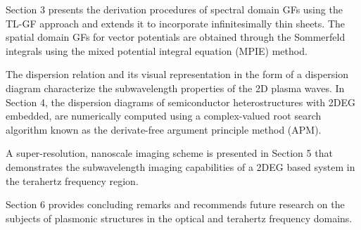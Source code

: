 Section 3 presents the derivation procedures of spectral domain GFs using the TL-GF approach \cite{Michalski1997,Michalski2005} and extends it to incorporate infinitesimally thin sheets. The spatial domain GFs for vector potentials are obtained through the Sommerfeld integrals using the mixed potential integral equation (MPIE) method.

The dispersion relation and its visual representation in the form of a dispersion diagram characterize the subwavelength properties of the 2D plasma waves. In Section 4, the dispersion diagrams of semiconductor heterostructures with 2DEG embedded, are numerically computed using a complex-valued root search algorithm known as the derivate-free argument principle method (APM).

A super-resolution, nanoscale imaging scheme is presented in Section 5 that demonstrates the subwavelength imaging capabilities of a 2DEG based system in the terahertz frequency region.

Section 6 provides concluding remarks and recommends future research on the subjects of plasmonic structures in the optical and terahertz frequency domains.
